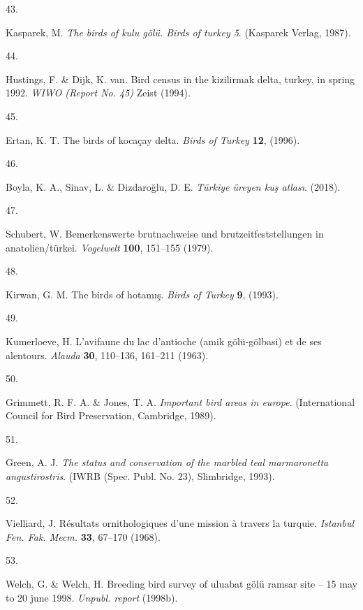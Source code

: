 \documentclass[
  letterpaper,
  DIV=11,
  numbers=noendperiod]{scrreprt}
\newlength{\cslhangindent}
\newlength{\csllabelwidth}
\newlength{\cslentryspacingunit} %
\newenvironment{CSLReferences}[2] %
 {%
  \setlength{\parindent}{0pt}
  \ifodd #1
  \let\oldpar\par
  \def\par{\hangindent=\cslhangindent\oldpar}
  \fi
  \setlength{\parskip}{#2\cslentryspacingunit}
 }%
 {}
\newcommand{\CSLLeftMargin}[1]{\parbox[t]{\csllabelwidth}{#1}}
\newcommand{\CSLRightInline}[1]{\parbox[t]{\linewidth - \csllabelwidth}{#1}\break}
\begin{document}
\begin{CSLReferences}{0}{0}
\leavevmode{}%
\CSLLeftMargin{43. }%
\CSLRightInline{Kasparek, M. \emph{The birds of kulu gölü. Birds of
turkey 5}. (Kasparek Verlag, 1987).}

\leavevmode{}%
\CSLLeftMargin{44. }%
\CSLRightInline{Hustings, F. \& Dijk, K. van. Bird census in the
kizilirmak delta, turkey, in spring 1992. \emph{WIWO (Report No. 45)}
Zeist (1994).}

\leavevmode{}%
\CSLLeftMargin{45. }%
\CSLRightInline{Ertan, K. T. The birds of kocaçay delta. \emph{Birds of
Turkey} \textbf{12}, (1996).}

\leavevmode{}%
\CSLLeftMargin{46. }%
\CSLRightInline{Boyla, K. A., Sinav, L. \& Dizdaroğlu, D. E.
\emph{Türkiye üreyen kuş atlası}. (2018).}

\leavevmode{}%
\CSLLeftMargin{47. }%
\CSLRightInline{Schubert, W. Bemerkenswerte brutnachweise und
brutzeitfeststellungen in anatolien/türkei. \emph{Vogelwelt}
\textbf{100}, 151--155 (1979).}

\leavevmode{}%
\CSLLeftMargin{48. }%
\CSLRightInline{Kirwan, G. M. The birds of hotamış. \emph{Birds of
Turkey} \textbf{9}, (1993).}

\leavevmode{}%
\CSLLeftMargin{49. }%
\CSLRightInline{Kumerloeve, H. L'avifaune du lac d'antioche (amik
gölü-gölbasi) et de ses alentours. \emph{Alauda} \textbf{30}, 110--136,
161--211 (1963).}

\leavevmode{}%
\CSLLeftMargin{50. }%
\CSLRightInline{Grimmett, R. F. A. \& Jones, T. A. \emph{Important bird
areas in europe}. (International Council for Bird Preservation,
Cambridge, 1989).}

\leavevmode{}%
\CSLLeftMargin{51. }%
\CSLRightInline{Green, A. J. \emph{The status and conservation of the
marbled teal marmaronetta angustirostris}. (IWRB (Spec. Publ. No. 23),
Slimbridge, 1993).}

\leavevmode{}%
\CSLLeftMargin{52. }%
\CSLRightInline{Vielliard, J. Résultats ornithologiques d'une mission à
travers la turquie. \emph{Istanbul Fen. Fak. Mecm.} \textbf{33}, 67--170
(1968).}

\leavevmode{}%
\CSLLeftMargin{53. }%
\CSLRightInline{Welch, G. \& Welch, H. Breeding bird survey of uluabat
gölü ramsar site -- 15 may to 20 june 1998. \emph{Unpubl. report}
(1998b).}


\end{CSLReferences}
\end{document}
